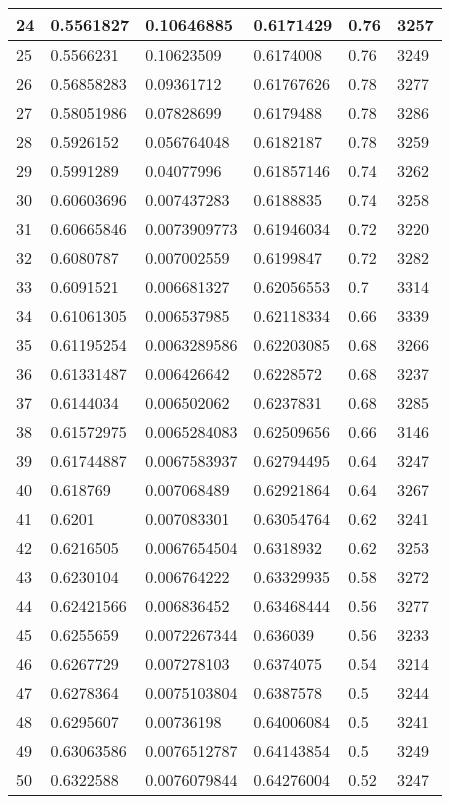 \begin{longtable}{|l|l|l|l|l|l|}
24 & 0.5561827 & 0.10646885 & 0.6171429 & 0.76 & 3257 \\ \hline 
25 & 0.5566231 & 0.10623509 & 0.6174008 & 0.76 & 3249 \\ \hline 
26 & 0.56858283 & 0.09361712 & 0.61767626 & 0.78 & 3277 \\ \hline 
27 & 0.58051986 & 0.07828699 & 0.6179488 & 0.78 & 3286 \\ \hline 
28 & 0.5926152 & 0.056764048 & 0.6182187 & 0.78 & 3259 \\ \hline 
29 & 0.5991289 & 0.04077996 & 0.61857146 & 0.74 & 3262 \\ \hline 
30 & 0.60603696 & 0.007437283 & 0.6188835 & 0.74 & 3258 \\ \hline 
31 & 0.60665846 & 0.0073909773 & 0.61946034 & 0.72 & 3220 \\ \hline 
32 & 0.6080787 & 0.007002559 & 0.6199847 & 0.72 & 3282 \\ \hline 
33 & 0.6091521 & 0.006681327 & 0.62056553 & 0.7 & 3314 \\ \hline 
34 & 0.61061305 & 0.006537985 & 0.62118334 & 0.66 & 3339 \\ \hline 
35 & 0.61195254 & 0.0063289586 & 0.62203085 & 0.68 & 3266 \\ \hline 
36 & 0.61331487 & 0.006426642 & 0.6228572 & 0.68 & 3237 \\ \hline 
37 & 0.6144034 & 0.006502062 & 0.6237831 & 0.68 & 3285 \\ \hline 
38 & 0.61572975 & 0.0065284083 & 0.62509656 & 0.66 & 3146 \\ \hline 
39 & 0.61744887 & 0.0067583937 & 0.62794495 & 0.64 & 3247 \\ \hline 
40 & 0.618769 & 0.007068489 & 0.62921864 & 0.64 & 3267 \\ \hline 
41 & 0.6201 & 0.007083301 & 0.63054764 & 0.62 & 3241 \\ \hline 
42 & 0.6216505 & 0.0067654504 & 0.6318932 & 0.62 & 3253 \\ \hline 
43 & 0.6230104 & 0.006764222 & 0.63329935 & 0.58 & 3272 \\ \hline 
44 & 0.62421566 & 0.006836452 & 0.63468444 & 0.56 & 3277 \\ \hline 
45 & 0.6255659 & 0.0072267344 & 0.636039 & 0.56 & 3233 \\ \hline 
46 & 0.6267729 & 0.007278103 & 0.6374075 & 0.54 & 3214 \\ \hline 
47 & 0.6278364 & 0.0075103804 & 0.6387578 & 0.5 & 3244 \\ \hline 
48 & 0.6295607 & 0.00736198 & 0.64006084 & 0.5 & 3241 \\ \hline 
49 & 0.63063586 & 0.0076512787 & 0.64143854 & 0.5 & 3249 \\ \hline 
50 & 0.6322588 & 0.0076079844 & 0.64276004 & 0.52 & 3247 \\ \hline 
\end{longtable}
